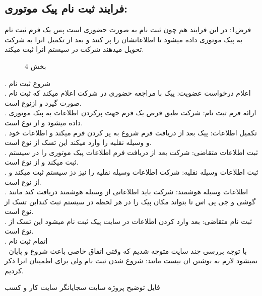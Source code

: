 \documentclass[12pt,onecolumn,a4paper]{article}
\begin{document}
\subsection{فرایند ثبت نام پیک موتوری:}
فرض1: در این فرایند هم چون ثبت نام به صورت حضوری است پس یک فرم ثبت نام به پیک موتوری داده میشود تا اطلاعاتشان را پر کنند و بعد از تکمیل انرا به شرکت تحویل میدهند شرکت در سیستم انرا ثبت میکند.\\
\begin{figure}[!h]
\caption{ بخش 4 }\label{biz44}
\end{figure}


.	شروع ثبت نام \\
.	اعلام درخواست عضویت: پیک با مراجعه حضوری در شرکت اعلام میکند که ثبت نام صورت گیرد و ازنوع است.\\
.	ارائه فرم ثبت نام: شرکت طبق فرض یک فرم جهت پرکردن اطلاعات به پیک موتوری داده میشود و از نوع  است.\\
.	تکمیل اطلاعات: پیک بعد از دریافت فرم شروع به پر کردن فرم میکند و اطلاعات خود و وسیله نقلیه را وارد میکند این تسک از نوع  است.\\
.	ثبت اطلاعات متقاضی: شرکت بعد از دریافت فرم اطلاعات پیک موتوری را در سیستم ثبت میکند و از نوع  است.\\
.	ثبت اطلاعات وسیله نقلیه: شرکت اطلاعات وسیله نقلیه را نیز دز سیستم ثبت میکند و از نوع  است.\\
.	اطلاعات وسیله هوشمند: شرکت باید اطلاعاتی از وسیله هوشمند دریافت کند مانند گوشی و جی پی اس  تا بتواند مکان پیک را در هر لحظه در سیستم ثبت کنداین تسک از نوع است.\\
.	 ثبت نام متقاضی: بعد وارد کردن اطلاعات در سایت پیک ثبت نام میشود این تسک از نوع است.\\
.	اتمام ثبت نام\\


	با توجه بررسی چند سایت متوجه شدیم که وقتی اتفاق خاصی باعث شروع و پایان نمیشود لازم به نوشتن ان نیست مانند: شروع شدن ثبت نام
ولی برای اطمینان انرا ذکر کردیم.




\newpage
\begin{thebibliography}{99}
\bibitem{}
فایل توضیح پروژه
\bibitem{}
سایت سجایانگر
\bibitem{}
سایت کار و کسب


\end{thebibliography}
\end{document}
